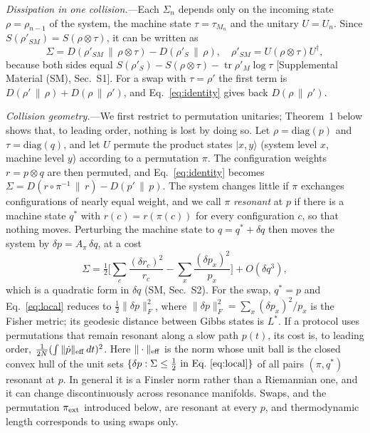 \documentclass[aps,prl,reprint,superscriptaddress,amsmath,amssymb]{revtex4-2}
\newcommand{\Tr}{\operatorname{tr}}
\newcommand{\Dr}[2]{D(#1\,\|\,#2)}
\begin{document}
\emph{Dissipation in one collision.}---Each $\Sigma_n$ depends only on the incoming state $\rho=\rho_{n-1}$ of the
system, the machine state $\tau=\tau_{M_n}$ and the unitary $U=U_n$. Since $S(\rho'_{SM})=S(\rho\otimes\tau)$, it can
be written as
\begin{equation}
\Sigma = \Dr{\rho'_{SM}}{\rho\otimes\tau} - \Dr{\rho'_S}{\rho},\quad \rho'_{SM}=U(\rho\otimes\tau)U^\dagger ,
\label{eq:identity}
\end{equation}
because both sides equal $S(\rho'_S)-S(\rho\otimes\tau)-\Tr\rho'_M\log\tau$ [Supplemental Material (SM), Sec.~S1]. For
a swap with $\tau=\rho'$ the first term is $\Dr{\rho'}{\rho}+\Dr{\rho}{\rho'}$, and Eq.~\eqref{eq:identity} gives back
$\Dr{\rho}{\rho'}$.

\emph{Collision geometry.}---We first restrict to permutation unitaries; Theorem~1 below shows that, to leading order,
nothing is lost by doing so. Let $\rho=\mathrm{diag}(p)$ and $\tau=\mathrm{diag}(q)$, and let $U$ permute the product
states $|x,y\rangle$ (system level $x$, machine level $y$) according to a permutation $\pi$. The configuration weights
$r=p\otimes q$ are then permuted, and Eq.~\eqref{eq:identity} becomes $\Sigma=\Dr{r\circ\pi^{-1}}{r}-\Dr{p'}{p}$. The
system changes little if $\pi$ exchanges configurations of nearly equal weight, and we call $\pi$ \emph{resonant} at
$p$ if there is a machine state $q^*$ with $r(c)=r(\pi(c))$ for every configuration $c$, so that nothing moves.
Perturbing the machine state to $q=q^*+\delta q$ then moves the system by $\delta p=A_\pi\,\delta q$, at a cost
\begin{equation}
\Sigma=\tfrac12\Big[\sum_c \frac{(\delta r_c)^2}{r_c} - \sum_x \frac{(\delta p_x)^2}{p_x}\Big] + O(\delta q^3),
\label{eq:local}
\end{equation}
which is a quadratic form in $\delta q$ (SM, Sec.~S2). For the swap, $q^*=p$ and Eq.~\eqref{eq:local} reduces to
$\tfrac12\|\delta p\|_F^2$, where $\|\delta p\|_F^2=\sum_x(\delta p_x)^2/p_x$ is the Fisher metric; its geodesic
distance between Gibbs states is $L^*$. If a protocol uses permutations that remain resonant along a slow path $p(t)$,
its cost is, to leading order, $\tfrac{1}{2N}(\int\|\dot p\|_{\rm eff}\,dt)^2$. Here $\|\cdot\|_{\rm eff}$ is the norm
whose unit ball is the closed convex hull of the unit sets $\{\delta p:\Sigma\leq\frac12\text{ in
Eq.~\eqref{eq:local}}\}$ of all pairs $(\pi,q^*)$ resonant at $p$. In general it is a Finsler norm rather than a
Riemannian one, and it can change discontinuously across resonance manifolds. Swaps, and the permutation
$\pi_{\rm ext}$ introduced below, are resonant at every $p$, and thermodynamic length corresponds to using swaps only.
\end{document}
